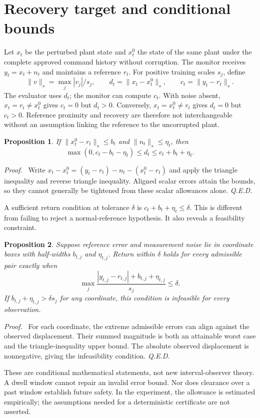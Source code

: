 \documentclass[11pt]{article}
\newtheorem{proposition}{Proposition}
\newenvironment{proof}{\par\noindent\textit{Proof.}\ }{\hfill\textit{Q.E.D.}\par}
\begin{document}
\section{Recovery target and conditional bounds}
Let $x_t$ be the perturbed plant state and $x_t^0$ the state of the same plant under the complete approved command history without corruption. The monitor receives $y_t=x_t+n_t$ and maintains a reference $r_t$. For positive training scales $s_j$, define
\begin{equation}
 \|v\|_s=\max_j |v_j|/s_j,\qquad
 d_t=\|x_t-x_t^0\|_s,\qquad c_t=\|y_t-r_t\|_s.
\end{equation}
The evaluator uses $d_t$; the monitor can compute $c_t$. With noise absent, $x_t=r_t\ne x_t^0$ gives $c_t=0$ but $d_t>0$. Conversely, $x_t=x_t^0\ne r_t$ gives $d_t=0$ but $c_t>0$. Reference proximity and recovery are therefore not interchangeable without an assumption linking the reference to the uncorrupted plant.

\begin{proposition}
If $\|x_t^0-r_t\|_s\le b_t$ and $\|n_t\|_s\le\eta_t$, then
\begin{equation}
 \max(0,c_t-b_t-\eta_t)\le d_t\le c_t+b_t+\eta_t.
\end{equation}
\end{proposition}
\begin{proof}
Write $x_t-x_t^0=(y_t-r_t)-n_t-(x_t^0-r_t)$ and apply the triangle inequality and reverse triangle inequality. Aligned scalar errors attain the bounds, so they cannot generally be tightened from these scalar allowances alone.
\end{proof}

A sufficient return condition at tolerance $\delta$ is $c_t+b_t+\eta_t\le\delta$. This is different from failing to reject a normal-reference hypothesis. It also reveals a feasibility constraint.

\begin{proposition}
Suppose reference error and measurement noise lie in coordinate boxes with half-widths $b_{t,j}$ and $\eta_{t,j}$. Return within $\delta$ holds for every admissible pair exactly when
\begin{equation}
 \max_j\frac{|y_{t,j}-r_{t,j}|+b_{t,j}+\eta_{t,j}}{s_j}\le\delta.
\end{equation}
If $b_{t,j}+\eta_{t,j}>\delta s_j$ for any coordinate, this condition is infeasible for every observation.
\end{proposition}
\begin{proof}
For each coordinate, the extreme admissible errors can align against the observed displacement. Their summed magnitude is both an attainable worst case and the triangle-inequality upper bound. The absolute observed displacement is nonnegative, giving the infeasibility condition.
\end{proof}
These are conditional mathematical statements, not new interval-observer theory. A dwell window cannot repair an invalid error bound. Nor does clearance over a past window establish future safety. In the experiment, the allowance is estimated empirically; the assumptions needed for a deterministic certificate are not asserted.
\end{document}
